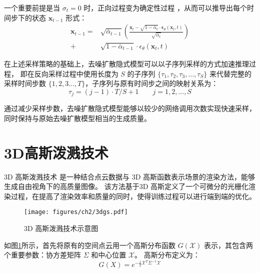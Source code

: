 一个重要前提是当 $\sigma_t=0$ 时，正向过程变为确定性过程 \cite{ddim}，从而可以推导出每个时间步下的状态 $\mathbf{x}_{t-1}$ 形式：
\begin{equation}
\begin{split}
     \mathbf{x}_{t-1} =& \sqrt{\bar{\alpha}_{t-1}}\left(\frac{\mathbf{x}_t-\sqrt{1-\bar{\alpha}_t} \cdot \boldsymbol{\epsilon}_\theta\left(\mathbf{x}_t, t\right)}{\sqrt{\bar{\alpha}_t}}\right) \\
     + &\sqrt{1-\bar{\alpha}_{t-1}} \cdot \epsilon_\theta\left(\mathbf{x}_t, t\right)
\end{split}
\end{equation}

在上述采样策略的基础上，去噪扩散隐式模型可以以子序列采样的方式加速推理过程，
即在反向采样过程中使用长度为 $S$ 的子序列 $\{\tau_1, \tau_2, \tau_3, ..., \tau_S\}$ 来代替完整的采样时间步数 $\{1,2,3..., T\}$，子序列与原有时间步之间的映射关系为：
\begin{equation}
    \tau_j=(j-1) \cdot T / S+1  \quad\quad j=1,2,...,S 
\end{equation}

通过减少采样步数，去噪扩散隐式模型能够以较少的网络调用次数实现快速采样，同时保持与原始去噪扩散模型相当的生成质量。


\section{3D高斯泼溅技术}
3D 高斯泼溅技术 \cite{3DGS} 是一种结合点云数据与 3D 高斯函数表示场景的渲染方法，能够生成自由视角下的高质量图像。
该方法基于3D 高斯定义了一个可微分的光栅化渲染过程，在提高了渲染效率和质量的同时，使得训练过程可以进行端到端的优化。

\begin{figure}
    \centering
    \texttt{[image: figures/ch2/3dgs.pdf]}
    \vspace{2mm}
    \caption{3D 高斯泼溅技术示意图}
    \label{img:3dgs}
\end{figure}

如图\ref{img:3dgs}所示，首先将原有的空间点云用一个高斯分布函数 $G(\mathcal{X})$ 表示，其包含两个重要参数：协方差矩阵 $\Sigma$ 和中心位置 $\mathcal{X}$。
高斯分布定义为：
\begin{equation}
\label{formula:gaussian's formula}
    G(X)=e^{-\frac{1}{2}\mathcal{X}^T\Sigma^{-1}\mathcal{X}}
\end{equation}

